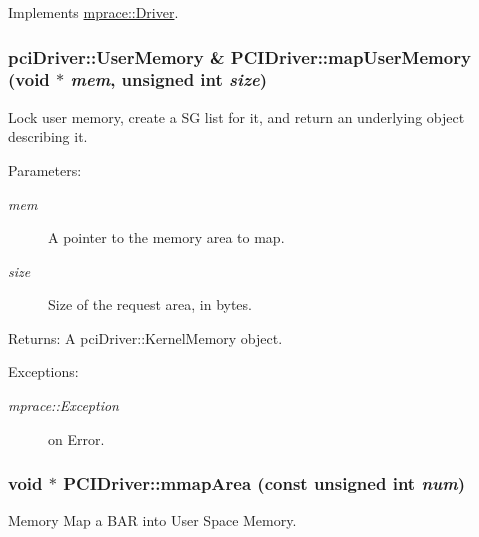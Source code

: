 Implements \hyperlink{classmprace_1_1Driver_a5}{mprace::Driver}.\hypertarget{classmprace_1_1PCIDriver_a8}{
\subsubsection[mapUserMemory]{\setlength{\rightskip}{0pt plus 5cm}pci\-Driver::User\-Memory \& PCIDriver::map\-User\-Memory (void $\ast$ {\em mem}, unsigned int {\em size})}}
\label{classmprace_1_1PCIDriver_a8}


Lock user memory, create a SG list for it, and return an underlying object describing it. 

\begin{Desc}
\item[Parameters:]
\begin{description}
\item[{\em mem}]A pointer to the memory area to map. \item[{\em size}]Size of the request area, in bytes. \end{description}
\end{Desc}
\begin{Desc}
\item[Returns:]A pci\-Driver::Kernel\-Memory object. \end{Desc}
\begin{Desc}
\item[Exceptions:]
\begin{description}
\item[{\em mprace::Exception}]on Error.\end{description}
\end{Desc}
\hypertarget{classmprace_1_1PCIDriver_a4}{
\subsubsection[mmapArea]{\setlength{\rightskip}{0pt plus 5cm}void $\ast$ PCIDriver::mmap\-Area (const unsigned int {\em num})}}
\label{classmprace_1_1PCIDriver_a4}


Memory Map a BAR into User Space Memory. 

